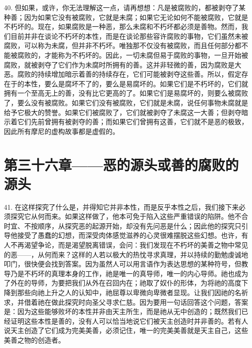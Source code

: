 40. 但如果，或许，你无法理解这一点，请再想想：凡是被腐败的，都被剥夺了某种善；因为如果它没有被腐败，它就是未腐；如果它无论如何不能被腐败，它就是不朽坏的。现在，如果腐败是一种恶，那么未腐和不朽坏都必须是善物。然而，我们目前并非在谈论不朽坏的本性，而是在谈论那些容许腐败的事物，它们虽然未被腐败，可以称为未腐，但并非不朽坏。唯独那不仅没有被腐败，而且任何部分都不能被腐败的，才能称为不朽坏的。因此，一切未腐但易于腐败的事物，一旦开始被腐败，就被剥夺了它们作为未腐时所拥有的善。这并非轻微的善，因为腐败是大恶。腐败的持续增加暗示着善的持续存在，它们可能被剥夺这些善。所以，假定存在于的本性，要么是腐坏不了的，要么是易腐坏的。如果它们是不朽坏的，它们就拥有一个至高无上的善，没有比它更高的了。如果它们是易腐坏的，则要么被腐败了，要么没有被腐败。如果它们没有被腐败，它们就是未腐，说任何事物未腐就是给予它极大的赞誉。如果它们被腐败了，它们就被剥夺了未腐这一大善；但剥夺暗示着它们先前曾拥有被剥夺的善；而如果它们曾拥有这善，它们就不是恶的极致，因此所有摩尼的虚构故事都是虚假的。\par


\section{第三十六章——恶的源头或善的腐败的源头}

41. 在这样探究了什么是，并得知它并非本性，而是反乎本性之后，我们接下来必须探究它从何而来。如果这样做了，他本可免于陷入这些严重错误的陷阱。他不合时宜、不按顺序，从探究恶的起源开始，却没有先问恶是什么；因此他的探究只引导他接受了愚蠢的幻想，而深受肉体感觉滋养的心灵很难摆脱这些幻想。也许，有人不再渴望争论，而是渴望脱离错误，会问：我们发现在不朽坏的美善之物中常见的恶——，从何而来？这样的人若以极大的热忱寻求真理，并以持续的勤勉虔诚地叩门，很快便会找到答案。因为虽然人可以用言语作为表达思想的某种符号，但教导乃是不朽坏的真理本身的工作，祂是唯一的真导师，唯一的内心导师。祂也成为了外在的导师，为要把我们从外在召回内在；祂取了奴仆的形体，为将祂的高度下降到那些向祂上升之人的认知中，祂屈尊以卑微向卑微者显现。让我们因祂的名祈求，并借着祂在做此探究时向圣父寻求仁慈。因为要用一句话回答这个问题，答案是：因为这些能够败坏的本性并非由天主所生，而是祂从无中创造的；既然我们已经证明这些本性是善的，没有人可以恰当地说它们被天主创造时并非善的。若有人说天主创造了它们成为完美美善，必须记住，唯一的完美美善就是天主自己，这些美善之物的创造者。\par

